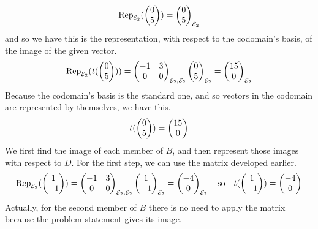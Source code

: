 \begin{exercises}
\begin{answer}
\begin{exparts}
\begin{equation*}
            \rep{\colvec{0 \\ 5}}{\stdbasis_2}=\colvec{0 \\ 5}_{\stdbasis_2}
          \end{equation*}
          and so we have this is the representation, with respect to the 
          codomain's basis, of the image of the given vector.
          \begin{equation*}
            \rep{t(\colvec{0 \\ 5})}{\stdbasis_2}
            =\begin{pmatrix}
              -1  &3   \\
               0  &0
             \end{pmatrix}_{\stdbasis_2,\stdbasis_2}
            \colvec{0 \\ 5}_{\stdbasis_2}
            =\colvec{15 \\ 0}_{\stdbasis_2}
          \end{equation*}
          Because the codomain's basis is the standard one, and so vectors
          in the codomain are represented by themselves, we have this.
          \begin{equation*}
            t(\colvec{0 \\ 5})
            =\colvec{15 \\ 0}
          \end{equation*}
        \partsitem We first find the image of each member of \( B \), and then
          represent those images with respect to \( D \).
          For the first step, we can use the matrix developed earlier.
          \begin{equation*}
            \rep{\colvec{1 \\-1}}{\stdbasis_2}
            =\begin{pmatrix}
              -1  &3   \\
               0  &0
             \end{pmatrix}_{\stdbasis_2,\stdbasis_2}
            \colvec{1 \\ -1}_{\stdbasis_2}
            =\colvec{-4 \\ 0}_{\stdbasis_2}
            \quad\text{so}\quad
            t(\colvec{1 \\ -1})=\colvec{-4 \\ 0}
          \end{equation*}
          Actually, for the second member of $B$ there is no need to apply the
          matrix because the problem statement gives its image.
          \begin{equation*}

\end{equation*}
\end{exparts}
\end{answer}
\end{exercises}
